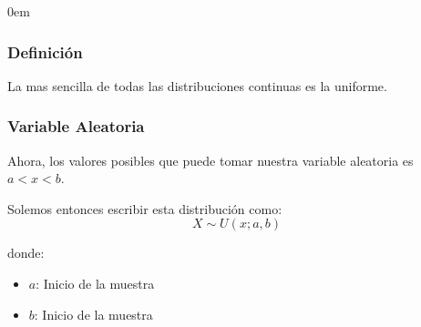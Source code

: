 \documentclass[12pt, fleqn]{report}                             %
\newenvironment{SmallIndentation}[1][0.75em]                    %
        {\begin{adjustwidth}{#1}{}\begin{footnotesize}}             %
        {\end{footnotesize}\end{adjustwidth}}                       %
\theoremstyle{break}                                            %
\begin{document}
                \begin{multicols}{2}
                \begin{SmallIndentation}[0em]

                    \subsubsection{Definición}

                        La mas sencilla de todas las distribuciones continuas es la uniforme.

                        \vspace{1em}
                        \subsubsection{Variable Aleatoria}


                            Ahora, los valores posibles que puede tomar nuestra variable aleatoria es
                            $ a< x < b$.

                            Solemos entonces escribir esta distribución como:
                            \begin{equation*}
                                X \sim U(x; a, b)
                            \end{equation*}

                            donde:
                            \begin{itemize}
                                \item $a$: Inicio de la muestra
                                \item $b$: Inicio de la muestra
                            \end{itemize}



\end{SmallIndentation}
\end{multicols}
\end{document}
